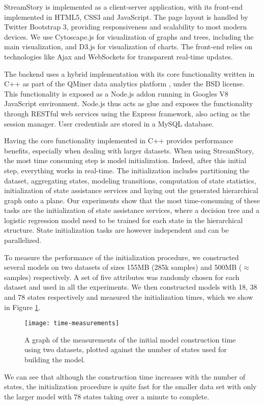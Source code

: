 StreamStory is implemented as a client-server application, with its front-end implemented in HTML5,
CSS3 and JavaScript. The page layout is handled by Twitter Bootstrap 3, providing 
responsiveness and scalability to most modern devices. We use Cytoscape.js
for visualization of graphs and trees, including the main visualization, and D3.js for visualization of charts.
The front-end relies on technologies like Ajax and WebSockets for transparent real-time
updates.

The backend uses a hybrid implementation with its core functionality written in C++
as part of the QMiner data analytics platform \cite{qminer}, under the BSD license.
This functionality is exposed as a Node.js addon running in Googles V8 JavaScript
environment. Node.js thus acts as glue and exposes the functionality through RESTful
web services using the Express framework, also acting as the session manager.
User credentials  are stored in a MySQL database.

Having the core functionality implemented in C++ provides performance benefits, especially
when dealing with larger datasets. When using StreamStory, the most time consuming step
is model initialization. Indeed, after this initial step, everything works in real-time.
The initialization includes partitioning the dataset, aggregating states, modeling transitions,
computation of state statistics, initialization of state assistance services and laying out the generated
hierarchical graph onto a plane. Our experiments show that the most time-consuming of these tasks are
the initialization of state assistance services, where a decision tree and a logistic regression
model need to be trained for each state in the hierarchical structure. State initialization tasks
are however independent and can be parallelized.

To measure the performance of the initialization procedure, we constructed several models on two datasets
of sizes 155MB (285k samples) and 500MB ($\approx$  samples) respectively. A set of five attributes
was randomly chosen for each dataset and used in all the experiments. We
then constructed models with 18, 38 and 78 states respectively and measured the initialization times,
which we show in Figure \ref{fig:performance}.
\begin{figure}[h!]
	\centering
	\texttt{[image: time-measurements]}
	\caption{A graph of the measurements of the initial model construction time using two datasets, plotted against the number of states used for building the model. }
	\label{fig:performance}
\end{figure}
We can see that although the construction time increases with the number of states, the initialization
procedure is quite fast for the smaller data set with only the larger model with 78 states taking over 
a minute to complete. 

